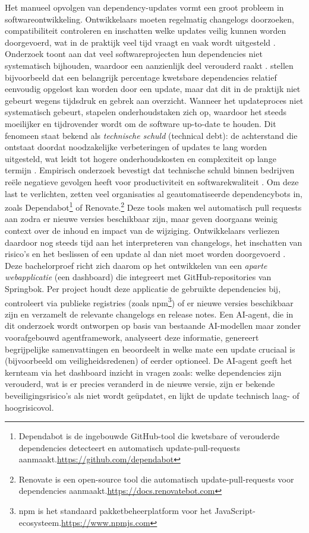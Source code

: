 Het manueel opvolgen van dependency-updates vormt een groot probleem in softwareontwikkeling. Ontwikkelaars moeten regelmatig changelogs doorzoeken, compatibiliteit controleren en inschatten welke updates veilig kunnen worden doorgevoerd, wat in de praktijk veel tijd vraagt en vaak wordt uitgesteld \autocite {Pashchenko2018,Behutiye2024}. Onderzoek toont aan dat veel softwareprojecten hun dependencies niet systematisch bijhouden, waardoor een aanzienlijk deel verouderd raakt \textcite {Pashchenko2018}. stellen bijvoorbeeld dat een belangrijk percentage kwetsbare dependencies relatief eenvoudig opgelost kan worden door een update, maar dat dit in de praktijk niet gebeurt wegens tijdsdruk en gebrek aan overzicht.
Wanneer het updateproces niet systematisch gebeurt, stapelen onderhoudstaken zich op, waardoor het steeds moeilijker en tijdrovender wordt om de software up-to-date te houden. Dit fenomeen staat bekend als \emph{technische schuld} (technical debt): de achterstand die ontstaat doordat noodzakelijke verbeteringen of updates te lang worden uitgesteld, wat leidt tot hogere onderhoudskosten en complexiteit op lange termijn \textcite {Behutiye2024,Ruiz2024}. Empirisch onderzoek bevestigt dat technische schuld binnen bedrijven reële negatieve gevolgen heeft voor productiviteit en softwarekwaliteit \textcite {Chalmers2020}.
Om deze last te verlichten, zetten veel organisaties al geautomatiseerde dependencybots in, zoals Dependabot\footnote{Dependabot is de ingebouwde GitHub-tool die kwetsbare of verouderde dependencies detecteert en automatisch update-pull-requests aanmaakt.\url{https://github.com/dependabot}} of Renovate.\footnote{Renovate is een open-source tool die automatisch update-pull-requests voor dependencies aanmaakt.\url{https://docs.renovatebot.com} } Deze tools maken wel automatisch pull requests aan zodra er nieuwe versies beschikbaar zijn,\textcite {Erlenhov2022} maar geven doorgaans weinig context over de inhoud en impact van de wijziging. Ontwikkelaars verliezen daardoor nog steeds tijd aan het interpreteren van changelogs, het inschatten van risico's en het beslissen of een update al dan niet moet worden doorgevoerd \textcite {Erlenhov2022}.
Deze bachelorproef richt zich daarom op het ontwikkelen van een \emph{aparte webapplicatie} (een dashboard) die integreert met GitHub-repositories van Springbok. Per project houdt deze applicatie de gebruikte dependencies bij, controleert via publieke registries (zoals npm\footnote{npm is het standaard pakketbeheerplatform voor het JavaScript-ecosysteem.\url{https://www.npmjs.com}}) of er nieuwe versies beschikbaar zijn en verzamelt de relevante changelogs en release notes. Een AI-agent, die in dit onderzoek wordt ontworpen op basis van bestaande AI-modellen maar zonder voorafgebouwd agentframework, analyseert deze informatie, genereert begrijpelijke samenvattingen en beoordeelt in welke mate een update cruciaal is (bijvoorbeeld om veiligheidsredenen) of eerder optioneel.
De AI-agent geeft het kernteam via het dashboard inzicht in vragen zoals: welke dependencies zijn verouderd, wat is er precies veranderd in de nieuwe versie, zijn er bekende beveiligingsrisico's als niet wordt geüpdatet, en lijkt de update technisch laag- of hoogrisicovol.

